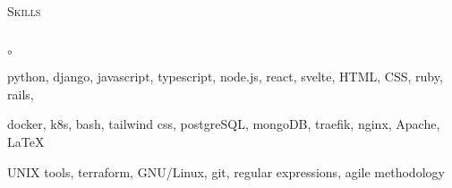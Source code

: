 \documentclass{article}
\newcommand{\lineunder}{\vspace*{-8pt} \\ \hspace*{-18pt} \hrulefill{} \\}
\newcommand{\header}[1]{{\hspace*{-15pt}\vspace*{6pt} \textsc{#1}} \vspace*{-6pt} \lineunder}
\newcommand{\project}[1]{{ \textbf{#1}  }}
\newenvironment{achievements}{\begin{list}{$\circ$}{\topsep 0pt \itemsep -2pt}}{\vspace*{4pt}\end{list}}
\begin{document}
\header{Skills}
\begin{achievements}
	\item python, django, javascript, typescript, node.js, react, svelte, HTML, CSS, ruby, rails,
	\item docker, k8s, bash, tailwind css, postgreSQL, mongoDB, traefik, nginx, Apache, \LaTeX{}
	\item UNIX tools, terraform, GNU/Linux, git, regular expressions, agile methodology
\end{achievements}




\end{document}
